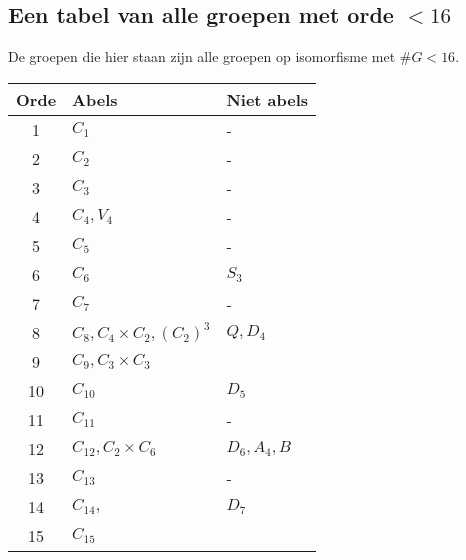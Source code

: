 \subsection{Een tabel van alle groepen met orde \texorpdfstring{\(<16\)}{<16}}
De groepen die hier staan zijn alle groepen op isomorfisme met \(\#G<16\).
\begin{center}
    \begin{tabular}{c|l|l}
        Orde & Abels                                   & Niet abels        \\\hline
        1    & \(C_{1}\)                               & -                 \\
        2    & \(C_{2}\)                               & -                 \\
        3    & \(C_{3}\)                               & -                 \\
        4    & \(C_{4}, V_{4}\)                        & -                 \\
        5    & \(C_{5}\)                               & -                 \\
        6    & \(C_{6}\)                               & \(S_{3}\)         \\
        7    & \(C_{7}\)                               & -                 \\
        8    & \(C_{8},C_{4}\times C_{2},(C_{2})^{3}\) & \(Q,D_{4}\)       \\
        9    & \(C_{9},C_{3}\times C_{3}\)             &                   \\
        10   & \(C_{10}\)                              & \(D_{5}\)         \\
        11   & \(C_{11}\)                              & -                 \\
        12   & \(C_{12},C_{2}\times C_{6}\)            & \(D_{6},A_{4},B\) \\
        13   & \(C_{13}\)                              & -                 \\
        14   & \(C_{14},\)                             & \(D_{7}\)         \\
        15   & \(C_{15}\)                              &
    \end{tabular}
\end{center}